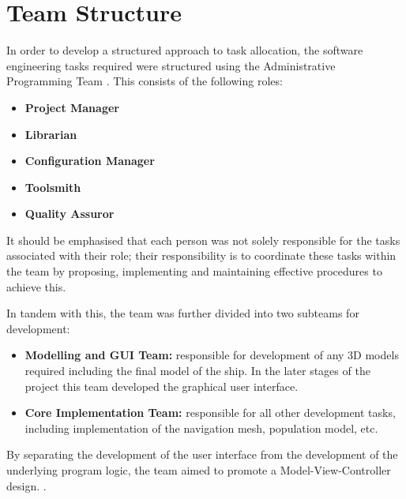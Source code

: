 %

\section{Team Structure}
\label{Team:subsec:structure}
In order to develop a structured approach to task allocation, the software engineering tasks required were structured using the Administrative Programming Team \cite{AdministrativeProgrammingTeam}. This consists of the following roles:
\begin{itemize}
\item{\textbf{Project Manager} }
\item{\textbf{Librarian} }
\item{\textbf{Configuration Manager} }
\item{\textbf{Toolsmith} }
\item{\textbf{Quality Assuror}}
\end{itemize}

It should be emphasised that each person was not solely responsible for the tasks associated with their role; their responsibility is to coordinate these tasks within the team by proposing, implementing and maintaining effective procedures to achieve this.

In tandem with this, the team was further divided into two subteams for development:
\begin{itemize}
\item \textbf{Modelling and GUI Team:} responsible for development of any 3D models required including the final model of the ship. In the later stages of the project this team developed the graphical user interface.
\item \textbf{Core Implementation Team:} responsible for all other development tasks, including implementation of the navigation mesh, population model, etc.
\end{itemize}

By separating the development of the user interface from the development of the underlying program logic, the team aimed to promote a Model-View-Controller design. \cite[Ch 6.3.1]{SommervilleSoftwareEng}.
  
